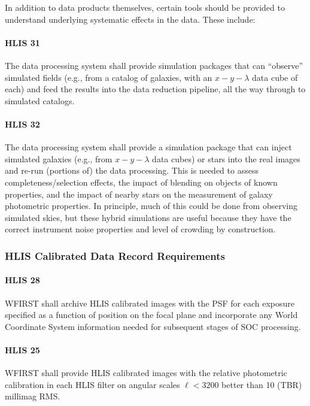In addition to data products themselves, certain tools should be provided to
understand underlying systematic effects in the data. These include:

\paragraph{HLIS 31} The data processing system shall provide simulation packages that can
“observe” simulated fields (e.g., from a catalog of galaxies, with an $x-y-\lambda$ data
cube of each) and feed the results into the data reduction pipeline, all the way
through to simulated catalogs.

\paragraph{HLIS 32} The data processing system shall provide a simulation package that can
inject simulated galaxies (e.g., from $x-y-\lambda$ data cubes) or stars into the real
images and re-run (portions of) the data processing. This is needed to assess
completeness/selection effects, the impact of blending on objects of known
properties, and the impact of nearby stars on the measurement of galaxy
photometric properties. In principle, much of this could be done from observing
simulated skies, but these hybrid simulations are useful because they have the
correct instrument noise properties and level of crowding by construction.

\subsubsection{HLIS Calibrated Data Record Requirements}

\paragraph{HLIS 28} WFIRST shall archive HLIS calibrated images with the PSF for each
exposure specified as a function of position on the focal plane and incorporate
any World Coordinate System information needed for subsequent stages of SOC
processing.

\paragraph{HLIS 25} WFIRST shall provide HLIS calibrated images with the relative
photometric calibration in each HLIS filter on angular scales $\ell < 3200$ better than
10 (TBR) millimag RMS.

